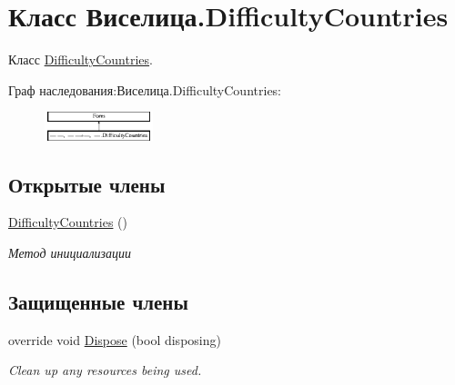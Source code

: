 \hypertarget{class_xD0_x92_xD0_xB8_xD1_x81_xD0_xB5_xD0_xBB_xD0_xB8_xD1_x86_xD0_xB0_1_1_difficulty_countries}{\section{Класс Виселица.\+Difficulty\+Countries}
\label{class_xD0_x92_xD0_xB8_xD1_x81_xD0_xB5_xD0_xBB_xD0_xB8_xD1_x86_xD0_xB0_1_1_difficulty_countries}
}


Класс \hyperlink{class_xD0_x92_xD0_xB8_xD1_x81_xD0_xB5_xD0_xBB_xD0_xB8_xD1_x86_xD0_xB0_1_1_difficulty_countries}{Difficulty\+Countries}.  


Граф наследования\+:Виселица.\+Difficulty\+Countries\+:\begin{figure}[H]
\begin{center}
\leavevmode
\includegraphics[height=0.830245cm]{class_xD0_x92_xD0_xB8_xD1_x81_xD0_xB5_xD0_xBB_xD0_xB8_xD1_x86_xD0_xB0_1_1_difficulty_countries}
\end{center}
\end{figure}
\subsection*{Открытые члены}
\begin{DoxyCompactItemize}
\item 
\hyperlink{class_xD0_x92_xD0_xB8_xD1_x81_xD0_xB5_xD0_xBB_xD0_xB8_xD1_x86_xD0_xB0_1_1_difficulty_countries_addbad0f815d9ec8edf66c921cc8e9a09}{Difficulty\+Countries} ()
\begin{DoxyCompactList}\small\item\em Метод инициализации \end{DoxyCompactList}\end{DoxyCompactItemize}
\subsection*{Защищенные члены}
\begin{DoxyCompactItemize}
\item 
override void \hyperlink{class_xD0_x92_xD0_xB8_xD1_x81_xD0_xB5_xD0_xBB_xD0_xB8_xD1_x86_xD0_xB0_1_1_difficulty_countries_a010ca1e5b4c957f505030083c2595eb7}{Dispose} (bool disposing)
\begin{DoxyCompactList}\small\item\em Clean up any resources being used. \end{DoxyCompactList}\end{DoxyCompactItemize}


